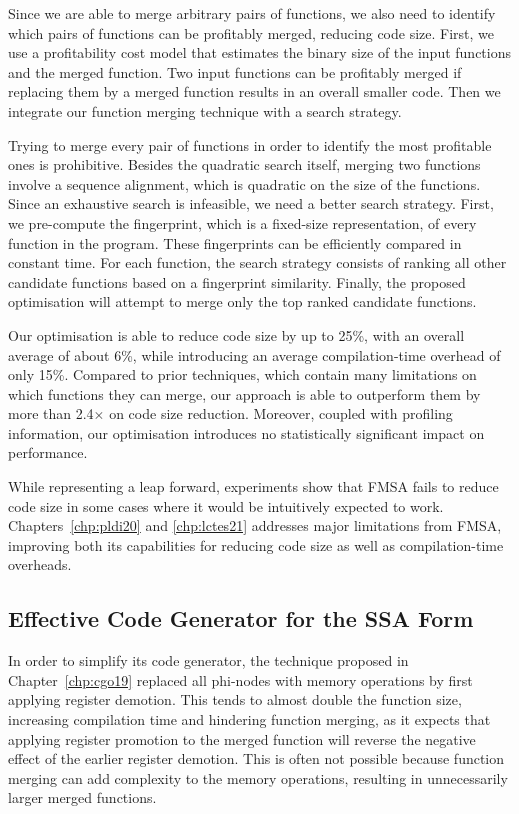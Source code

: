 Since we are able to merge arbitrary pairs of functions, we also need to identify which pairs of functions can be profitably merged, reducing code size.
First, we use a profitability cost model that estimates the binary size of the input functions and the merged function.
Two input functions can be profitably merged if replacing them by a merged function results in an overall smaller code.
Then we integrate our function merging technique with a search strategy.

Trying to merge every pair of functions in order to identify the most profitable ones is prohibitive.
Besides the quadratic search itself, merging two functions involve a sequence alignment, which is quadratic on the size of the functions.
Since an exhaustive search is infeasible, we need a better search strategy.
First, we pre-compute the fingerprint, which is a fixed-size representation, of every function in the program.
These fingerprints can be efficiently compared in constant time.
For each function, the search strategy consists of ranking all other candidate functions based on a fingerprint similarity.
Finally, the proposed optimisation will attempt to merge only the top ranked candidate functions.

Our optimisation is able to reduce code size by up to 25\%, with an overall average of about 6\%, while introducing an average compilation-time overhead of only 15\%.
Compared to prior techniques, which contain many limitations on which functions they can merge, our approach is able to outperform them by more than 2.4$\times$ on code size reduction.
Moreover, coupled with profiling information, our optimisation introduces no statistically significant impact on performance.

While representing a leap forward, experiments show that FMSA fails to reduce code size in some cases where it would be intuitively expected to work. Chapters~\ref{chp:pldi20} and \ref{chp:lctes21} addresses major limitations from FMSA, improving both its capabilities for reducing code size as well as compilation-time overheads.

\subsection{Effective Code Generator for the SSA Form}

In order to simplify its code generator, the technique proposed in Chapter~\ref{chp:cgo19} replaced all phi-nodes with memory operations by first applying register demotion.
This tends to almost double the function size, increasing compilation time and hindering function merging, as it expects that applying register promotion to the merged function will reverse the negative effect of the earlier register demotion.
This is often not possible because function merging can add complexity to the memory operations, resulting in unnecessarily larger merged functions.

